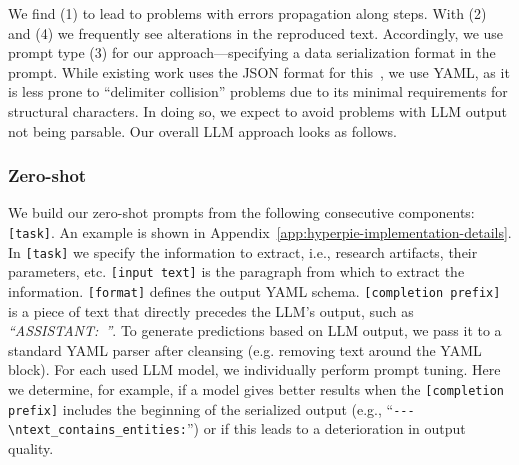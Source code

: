 We find (1) to lead to problems with errors propagation along steps. With (2) and (4) we frequently see alterations in the reproduced text. Accordingly, we use prompt type (3) for our approach---specifying a data serialization format in the prompt.
While existing work uses the JSON format for this~\cite{Dunn2022}, we use YAML, as it is less prone to ``delimiter collision'' problems due to its minimal requirements for structural characters. 
In doing so, we expect to avoid problems with LLM output not being parsable. Our overall LLM approach looks as follows.
%
%

\subsubsection{Zero-shot} We build our zero-shot prompts from the following consecutive components: \texttt{[task]\allowbreak[format]}.
An example is shown in Appendix~\ref{app:hyperpie-implementation-details}.
In \texttt{[task]} we specify the information to extract, i.e., research artifacts, their parameters, etc. \texttt{[input text]} is the paragraph from which to extract the information. \texttt{[format]} defines the output YAML schema. \texttt{[completion prefix]} is a piece of text that directly precedes the LLM's output, such as \textit{``ASSISTANT:~''}.
%
%
To generate predictions based on LLM output, we pass it to a standard YAML parser after cleansing (e.g. removing text around the YAML block).
%
%
For each used LLM model, we individually perform prompt tuning. Here we determine, for example, if a model gives better results when the \texttt{[completion prefix]} includes the beginning of the serialized output (e.g., ``\texttt{-{}-{}-\allowbreak\textbackslash n\allowbreak text\_\allowbreak contains\_\allowbreak entities:}'') or if this leads to a deterioration in output quality.

